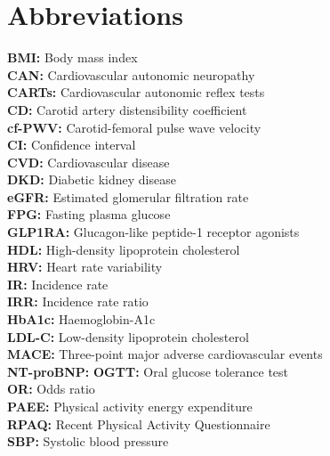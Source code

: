 \documentclass[
  a4paper,
  headsepline=true,
  open=any]{scrbook}
\begin{document}
{\let\clearpage\relax \tableofcontents} 

\listoffigures

\listoftables


\hypertarget{abbreviations}{%
\chapter*{Abbreviations}\label{abbreviations}}


\textbf{BMI:} Body mass index\\
\textbf{CAN:} Cardiovascular autonomic neuropathy\\
\textbf{CARTs:} Cardiovascular autonomic reflex tests\\
\textbf{CD:} Carotid artery distensibility coefficient\\
\textbf{cf-PWV:} Carotid-femoral pulse wave velocity\\
\textbf{CI:} Confidence interval\\
\textbf{CVD:} Cardiovascular disease\\
\textbf{DKD:} Diabetic kidney disease\\
\textbf{eGFR:} Estimated glomerular filtration rate\\
\textbf{FPG:} Fasting plasma glucose\\
\textbf{GLP1RA:} Glucagon-like peptide-1 receptor agonists\\
\textbf{HDL:} High-density lipoprotein cholesterol\\
\textbf{HRV:} Heart rate variability\\
\textbf{IR:} Incidence rate\\
\textbf{IRR:} Incidence rate ratio\\
\textbf{HbA1c:} Haemoglobin-A1c\\
\textbf{LDL-C:} Low-density lipoprotein cholesterol\\
\textbf{MACE:} Three-point major adverse cardiovascular events\\
\textbf{NT-proBNP:} \textbf{OGTT:} Oral glucose tolerance test\\
\textbf{OR:} Odds ratio\\
\textbf{PAEE:} Physical activity energy expenditure\\
\textbf{RPAQ:} Recent Physical Activity Questionnaire\\
\textbf{SBP:} Systolic blood pressure\\
\end{document}
